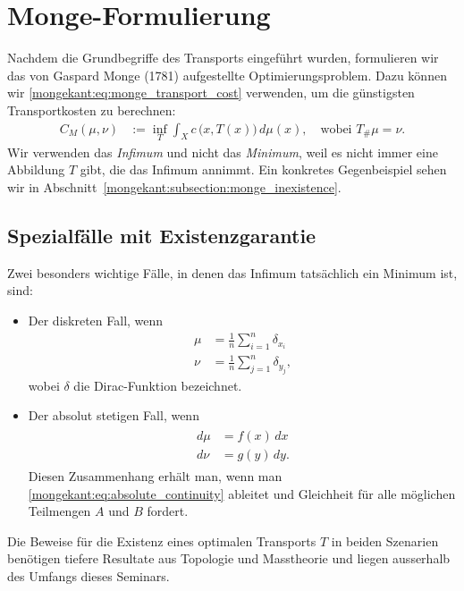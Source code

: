 %
%
%
%
\section{Monge-Formulierung%
\label{mongekant:section:teil1}}

Nachdem die Grundbegriffe des Transports eingeführt wurden,
formulieren wir das von Gaspard Monge (1781) aufgestellte Optimierungsproblem.
Dazu können wir \eqref{mongekant:eq:monge_transport_cost} verwenden,
um die günstigsten Transportkosten zu berechnen:
\begin{align}
C_M(\mu, \nu)
&:=
\inf_{T}
\int_X c\,\bigl(x, T(x)\bigr)\, d\mu(x)
,\quad
\text{wobei } T_{\#}\mu=\nu
.
\label{mongekant:eq:monge_problem}
\end{align}
Wir verwenden das \emph{Infimum} und nicht das \emph{Minimum},
weil es nicht immer eine Abbildung $T$ gibt,
die das Infimum annimmt.
Ein konkretes Gegenbeispiel sehen wir in
Abschnitt~\ref{mongekant:subsection:monge_inexistence}.

\subsection{Spezialfälle mit Existenzgarantie}
Zwei besonders wichtige Fälle,
in denen das Infimum tatsächlich ein Minimum ist,
sind:
\begin{itemize}
\item Der diskreten Fall, wenn
\begin{align*}
\mu
&=
\frac{1}{n} \sum_{i=1}^n \delta_{x_i}
\\
\nu
&=
\frac{1}{n} \sum_{j=1}^n \delta_{y_j}
,
\end{align*}
wobei $\delta$ die Dirac-Funktion bezeichnet.
\item Der absolut stetigen Fall, wenn
\begin{align}
\begin{aligned}
d\mu
&=
f(x)\, dx
\\
d\nu
&=
g(y)\, dy
.
\end{aligned}
\label{mongekant:eq:absolute_densities}
\end{align}
Diesen Zusammenhang erhält man,
wenn man \eqref{mongekant:eq:absolute_continuity} ableitet und
Gleichheit für alle möglichen Teilmengen $A$ und $B$ fordert.
\end{itemize}
Die Beweise für die Existenz eines optimalen Transports $T$ in beiden Szenarien
benötigen tiefere Resultate aus Topologie und Masstheorie und
liegen ausserhalb des Umfangs dieses Seminars.

